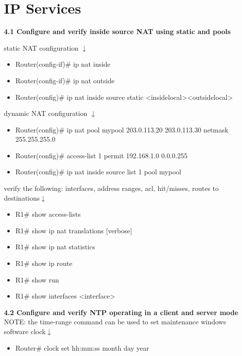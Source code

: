 \documentclass{article}
\begin{document}
\section{IP Services}
\textbf{4.1 Configure and verify inside source NAT using static and pools}

static NAT configuration $\downarrow$
\begin{itemize}
\item Router(config-if)\# ip nat inside
\item Router(config-if)\# ip nat outside
\item Router(config)\# ip nat inside source static \textless inside\-local\textgreater \textless outside\-local\textgreater
\end{itemize}

dynamic NAT configuration $\downarrow$
\begin{itemize}
\item Router(config)\# ip nat pool mypool 203.0.113.20 203.0.113.30 netmask 255.255.255.0
\item Router(config)\# access-list 1 permit 192.168.1.0 0.0.0.255
\item Router(config)\# ip nat inside source list 1 pool mypool
\end{itemize}

verify the following: interfaces, address ranges, acl, hit/misses, routes to destinations$\downarrow$
\begin{itemize}
\item R1\# show access-lists
\item R1\# show ip nat translations [verbose]
\item R1\# show ip nat statistics
\item R1\# show ip route
\item R1\# show run
\item R1\# show interfaces \textless interface\textgreater
\end{itemize}
		
\textbf{4.2 Configure and verify NTP operating in a client and server mode}\\

NOTE: the time-range command can be used to set maintenance windows\\
	
software clock$\downarrow$
\begin{itemize}
\item Router\# clock set hh:mm:ss month day year
\end{itemize}
		
\end{document}
